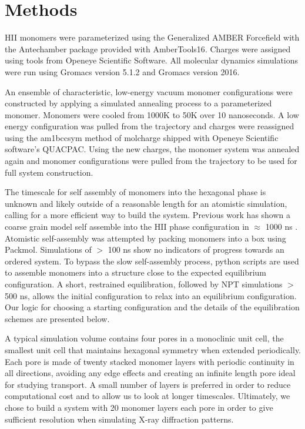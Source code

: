 \section*{Methods}
	
HII monomers were parameterized using the Generalized AMBER Forcefield
\cite{wang_development_2004} with the Antechamber package\cite{wang_automatic_2006}
provided with AmberTools16\cite{case_ambertools16_2016}. Charges were
assigned using tools from Openeye Scientific Software. All molecular 
dynamics simulations were run using Gromacs version 5.1.2 and Gromacs 
version 2016. \cite{bekker_gromacs:_1993,berendse n_gromacs:_1995,
van_der_spoel_gromacs:_2005,hess_gromacs_2008}
	
An ensemble of characteristic, low-energy vacuum monomer configurations
were constructed by applying a simulated annealing process to a
parameterized monomer. Monomers were cooled from 1000K to 50K over 10
nanoseconds. A low energy configuration was pulled from the trajectory 
and charges were reassigned using the am1bccsym method of molcharge
shipped with Openeye Scientific software's QUACPAC. Using the new
charges, the monomer system was annealed again and monomer
configurations were pulled from the trajectory to be used for full
system construction.
	
The timescale for self assembly of monomers into the hexagonal phase is
unknown and likely outside of a reasonable length for an atomistic
simulation, calling for a more efficient way to build the system. 
Previous work has shown a coarse grain model self assemble into the HII
phase configuration in $\approx$ 1000 ns \cite{mondal_self-assembly_2013}.
Atomistic self-assembly was attempted by packing monomers into a box 
using Packmol\cite{martinez_packmol:_2009}. Simulations of $>$ 100 ns 
show no indicators of progress towards an ordered system. To bypass the
slow self-assembly process, python scripts are used to assemble 
monomers into a structure close to the expected equilibrium configuration.
A short, restrained equilibration, followed by NPT simulations $>$ 500 ns, 
allows the initial configuration to relax into an equilibrium configuration.
Our logic for choosing a starting configuration and the details of the equilibration 
schemes are presented below. %

A typical simulation volume contains four pores in a monoclinic unit cell,
the smallest unit cell that maintains hexagonal symmetry when extended 
periodically. Each pore is made of twenty stacked monomer layers with
periodic continuity in all directions, avoiding any edge effects and 
creating an infinite length pore ideal for studying transport. A small
number of layers is preferred in order to reduce computational cost and 
to allow us to look at longer timescales. Ultimately, we chose to build a system
with 20 monomer layers each pore in order to give sufficient
resolution when simulating X-ray diffraction patterns.  %

